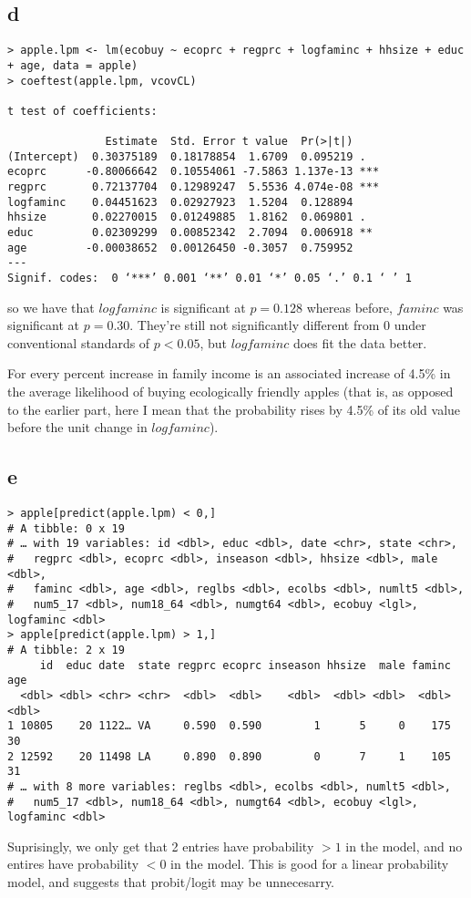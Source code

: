 \documentclass[12pt,letterpaper]{article}
\theoremstyle{definition}
\begin{document}
\subsection*{d}
\begin{Verbatim}[fontsize=\small]
> apple.lpm <- lm(ecobuy ~ ecoprc + regprc + logfaminc + hhsize + educ + age, data = apple)
> coeftest(apple.lpm, vcovCL)

t test of coefficients:

               Estimate  Std. Error t value  Pr(>|t|)
(Intercept)  0.30375189  0.18178854  1.6709  0.095219 .
ecoprc      -0.80066642  0.10554061 -7.5863 1.137e-13 ***
regprc       0.72137704  0.12989247  5.5536 4.074e-08 ***
logfaminc    0.04451623  0.02927923  1.5204  0.128894
hhsize       0.02270015  0.01249885  1.8162  0.069801 .
educ         0.02309299  0.00852342  2.7094  0.006918 **
age         -0.00038652  0.00126450 -0.3057  0.759952
---
Signif. codes:  0 ‘***’ 0.001 ‘**’ 0.01 ‘*’ 0.05 ‘.’ 0.1 ‘ ’ 1
\end{Verbatim}
so we have that $logfaminc$ is significant at $p = 0.128$ whereas before, $faminc$ was significant at $p = 0.30$. They're still not significantly different from 0 under conventional standards of $p < 0.05$, but $logfaminc$ does fit the data better.

For every percent increase in family income is an associated increase of 4.5\% in the average likelihood of buying ecologically friendly apples (that is, as opposed to the earlier part, here I mean that the probability rises by 4.5\% of its old value before the unit change in $logfaminc$).

\subsection*{e}

\begin{Verbatim}[fontsize=\small]
> apple[predict(apple.lpm) < 0,]
# A tibble: 0 x 19
# … with 19 variables: id <dbl>, educ <dbl>, date <chr>, state <chr>,
#   regprc <dbl>, ecoprc <dbl>, inseason <dbl>, hhsize <dbl>, male <dbl>,
#   faminc <dbl>, age <dbl>, reglbs <dbl>, ecolbs <dbl>, numlt5 <dbl>,
#   num5_17 <dbl>, num18_64 <dbl>, numgt64 <dbl>, ecobuy <lgl>, logfaminc <dbl>
> apple[predict(apple.lpm) > 1,]
# A tibble: 2 x 19
     id  educ date  state regprc ecoprc inseason hhsize  male faminc   age
  <dbl> <dbl> <chr> <chr>  <dbl>  <dbl>    <dbl>  <dbl> <dbl>  <dbl> <dbl>
1 10805    20 1122… VA     0.590  0.590        1      5     0    175    30
2 12592    20 11498 LA     0.890  0.890        0      7     1    105    31
# … with 8 more variables: reglbs <dbl>, ecolbs <dbl>, numlt5 <dbl>,
#   num5_17 <dbl>, num18_64 <dbl>, numgt64 <dbl>, ecobuy <lgl>, logfaminc <dbl>
\end{Verbatim}
Suprisingly, we only get that 2 entries have probability $> 1$ in the model, and no entires have probability $< 0$ in the model. This is good for a linear probability model, and suggests that probit/logit may be unnecesarry.
\end{document}

